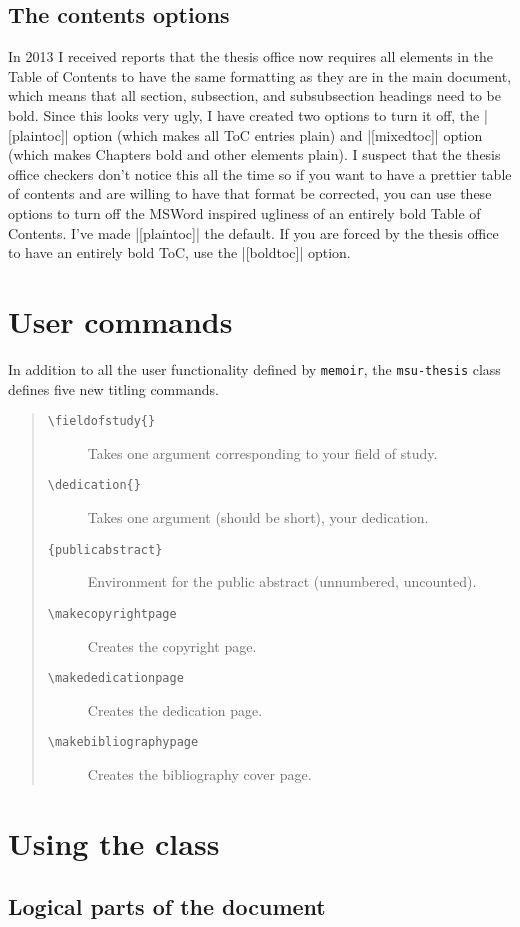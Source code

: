 \documentclass[11pt]{article}
\newcommand*\bs{\textbackslash}
\newcommand*{\pkg}[1]{\texttt{#1}\xspace}
\begin{document}
\subsection{The contents options}
In 2013 I received reports that the thesis office now requires all elements in the Table of Contents to have the same formatting as they are in the main document, which means that all section, subsection, and subsubsection headings need to be bold.  Since this looks very ugly, I have created two options to turn it off, the |[plaintoc]| option (which makes all ToC entries plain) and |[mixedtoc]| option (which makes Chapters bold and other elements plain). I suspect that the thesis office checkers don't notice this all the time so if you want to have a prettier table of contents and are willing to have that format be corrected, you can use these options to turn off the MSWord inspired ugliness of an entirely bold Table of Contents. I've made |[plaintoc]| the default.  If you are forced by the thesis office to have an entirely bold ToC, use the |[boldtoc]| option.

\section{User commands}
In addition to all the user functionality defined by \pkg{memoir}, the \pkg{msu-thesis} class defines five new titling commands. 
\begin{quote}
\begin{description}
\item[\texttt{\bs fieldofstudy\{\}}] Takes one argument corresponding to your field of study.
\item[\texttt{\bs dedication\{\}}] Takes one argument (should be short), your dedication.
\item[\texttt{\{publicabstract\}}] Environment for the public abstract (unnumbered, uncounted).
\item[\texttt{\bs makecopyrightpage}] Creates the copyright page.
\item[\texttt{\bs makededicationpage}] Creates the dedication page.
\item[\texttt{\bs makebibliographypage}] Creates the bibliography cover page.
\end{description}
\end{quote}
\section{Using the class}
\subsection{Logical parts of the document}
\end{document}
